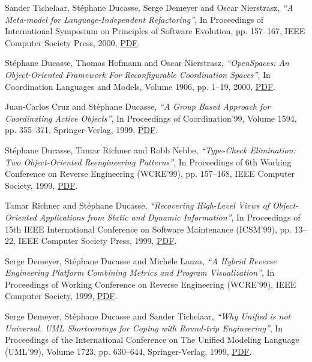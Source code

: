 \documentclass{article}
\newcommand{\czauthors}[1]{#1}
\newcommand{\cztitle}[1]{\emph{``#1''}}
\newcommand{\czbooktitle}[1]{#1}
\begin{document}
\begin{itemize}
	\pub  \czauthors{Sander Tichelaar, St\'ephane Ducasse, Serge Demeyer and Oscar Nierstrasz},  \cztitle{A Meta-model for Language-Independent Refactoring},  In \czbooktitle{Proceedings of International Symposium on Principles of Software Evolution}, pp. 157--167, IEEE Computer Society Press, 2000, \href{http://rmod-files.lille.inria.fr/Team/Texts/Papers/Tich00bRefactoringMetamodel.pdf}{PDF}.

	\pub  \czauthors{St\'ephane Ducasse, Thomas Hofmann and Oscar Nierstrasz},  \cztitle{OpenSpaces: An Object-Oriented Framework For Reconfigurable Coordination Spaces},  In \czbooktitle{Coordination Languages and Models}, Volume 1906, pp. 1--19, 2000, \href{http://rmod-files.lille.inria.fr/Team/Texts/Papers/Duca00dOpenSpaces.pdf}{PDF}.

	\pub  \czauthors{Juan-Carlos Cruz and St\'ephane Ducasse},  \cztitle{A Group Based Approach for Coordinating Active Objects},  In \czbooktitle{Proceedings of Coordination'99}, Volume 1594, pp. 355--371, Springer-Verlag, 1999, \href{http://rmod-files.lille.inria.fr/Team/Texts/Papers/Cruz99a-GroupBasedApproach.pdf}{PDF}.

	\pub  \czauthors{St\'ephane Ducasse, Tamar Richner and Robb Nebbe},  \cztitle{Type-Check Elimination: Two Object-Oriented Reengineering Patterns},  In \czbooktitle{Proceedings of 6th Working Conference on Reverse Engineering (WCRE'99)}, pp. 157--168, IEEE Computer Society, 1999, \href{http://rmod-files.lille.inria.fr/Team/Texts/Papers/Duca99cTypeCheckElim.pdf}{PDF}.

	\pub  \czauthors{Tamar Richner and St\'ephane Ducasse},  \cztitle{Recovering High-Level Views of Object-Oriented Applications from Static and Dynamic Information},  In \czbooktitle{Proceedings of 15th IEEE International Conference on Software Maintenance (ICSM'99)}, pp. 13--22, IEEE Computer Society Press, 1999, \href{http://rmod-files.lille.inria.fr/Team/Texts/Papers/Rich99aRecoveringViews.pdf}{PDF}.

	\pub  \czauthors{Serge Demeyer, St\'ephane Ducasse and Michele Lanza},  \cztitle{A Hybrid Reverse Engineering Platform Combining Metrics and Program Visualization},  In \czbooktitle{Proceedings of Working Conference on Reverse Engineering (WCRE'99)}, IEEE Computer Society, 1999, \href{http://rmod-files.lille.inria.fr/Team/Texts/Papers/Deme99c-WCRE-CodeCrawler.pdf}{PDF}.

	\pub  \czauthors{Serge Demeyer, St\'ephane Ducasse and Sander Tichelaar},  \cztitle{Why Unified is not Universal. {UML} Shortcomings for Coping with Round-trip Engineering},  In \czbooktitle{Proceedings of the International Conference on The Unified Modeling Language (UML'99)}, Volume 1723, pp. 630--644, Springer-Verlag, 1999, \href{http://rmod-files.lille.inria.fr/Team/Texts/Papers/Deme99d-UML99.pdf}{PDF}.


\end{itemize}
\end{document}
